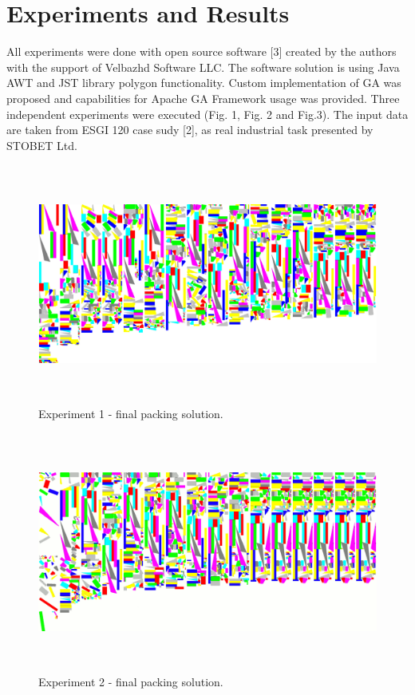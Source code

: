 \documentclass{llncs}
\begin{document}
\section{Experiments and Results}
%
All experiments were done with open source software [3] created by the authors with the support of Velbazhd Software LLC. The software solution is using Java AWT and JST library polygon functionality. Custom implementation of GA was proposed and capabilities for Apache GA Framework usage was provided. Three independent experiments were executed (Fig. 1, Fig. 2 and Fig.3). The input data are taken from ESGI 120 case sudy [2], as real industrial task presented by STOBET Ltd.
%
\begin{figure}
	\centering
	\includegraphics[width=12.62cm,height=7.88cm]{fig01.png}
	\caption{Experiment 1 - final packing solution.}
	\label{fig:Graph}
\end{figure}
%
\begin{figure}
	\centering
	\includegraphics[width=12.62cm,height=7.88cm]{fig02.png}
	\caption{Experiment 2 - final packing solution.}
	\label{fig:Graph}
\end{figure}
\end{document}
